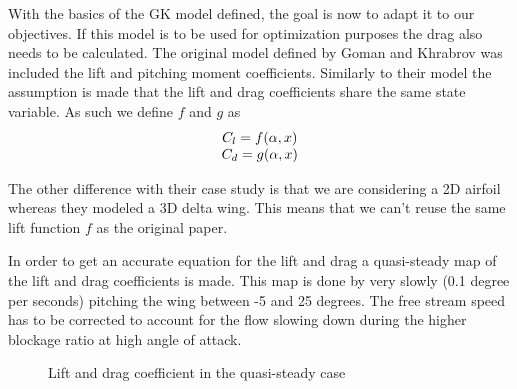 \par 





With the basics of the GK model defined, the goal is now to adapt it to our objectives.
If this model is to be used for optimization purposes the drag also needs to be calculated.
The original model defined by Goman and Khrabrov was included the lift and pitching moment coefficients.
Similarly to their model the assumption is made that the lift and drag coefficients share the same state variable.
As such we define $f$ and $g$ as
\begin{equation}
	\begin{array}[c]{c}
		C_l=f(\alpha,x) \\
		C_d=g(\alpha,x)
	\end{array}
	\label{eqn:lift_drag_functions}
\end{equation}

\par The other difference with their case study is that we are considering a 2D airfoil whereas they modeled a 3D delta wing.
This means that we can't reuse the same lift function $f$ as the original paper.

\par In order to get an accurate equation for the lift and drag a quasi-steady map of the lift and drag coefficients is made.
This map is done by very slowly (0.1 degree per seconds) pitching the wing between -5 and 25 degrees.
The free stream speed has to be corrected to account for the flow slowing down during the higher blockage ratio at high angle of attack.

\begin{figure}[ht]
	\begin{center}
	\end{center}
	\caption{Lift and drag coefficient in the quasi-steady case}
	\label{fig:QS_Cl_Cd_vs_alpha}
\end{figure}

